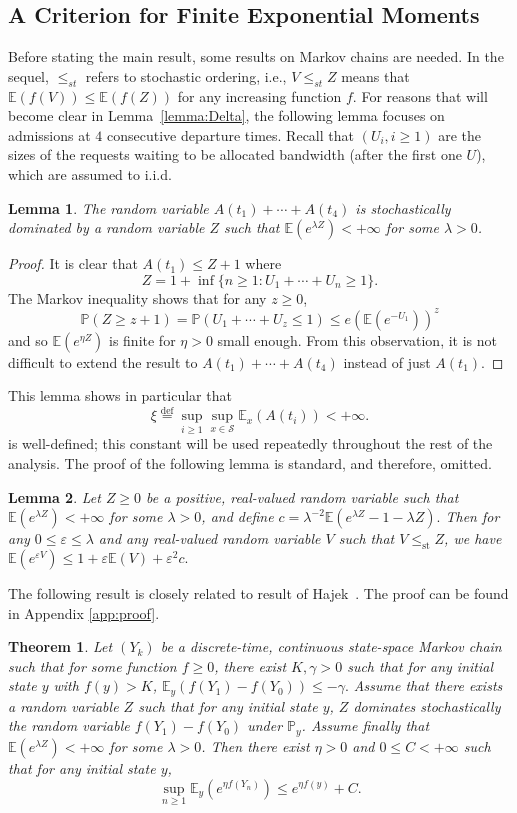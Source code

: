 \documentclass{amsart}
\def\E{\mathbb{E}}
\def\P{\mathbb{P}}
\def\Scal{\mathcal{S}}
\newtheorem{theorem}{Theorem}
\newtheorem{lemma}{Lemma}
\begin{document}
\subsection*{A Criterion for Finite Exponential Moments}
Before stating the main result, some  results on Markov chains are
needed. In the sequel, $\leq_{st}$ refers to stochastic ordering,
i.e., $V \leq_{st} Z$ means that $\E(f(V)) \leq \E(f(Z))$ for any
increasing function $f$. For reasons that will become clear in Lemma~\ref{lemma:Delta},
the following lemma focuses on admissions at $4$ consecutive departure
times. Recall that $(U_i, i \geq 1)$ are the sizes of the requests waiting to be allocated bandwidth (after the first one $U$), which are assumed to i.i.d.
\begin{lemma}\label{lemma:coupling}
    The random variable $A(t_1) + \cdots + A(t_4)$ is stochastically dominated by a random
    variable $Z$ such that $\E(e^{\lambda Z}) < +\infty$ for some $\lambda > 0$.
\end{lemma}
\begin{proof}
It is clear that $A(t_1) \leq Z+1$ where
    \[ Z = 1 + \inf \{ n \geq 1: U_1 + \cdots + U_n \geq 1\}. \]
The Markov inequality shows that for any $z
\geq 0$,
 \[ \P(Z \geq z+1) = \P(U_1 + \cdots + U_z \leq 1) \leq
    e \left( \E\left( e^{-U_1} \right) \right)^z \]
and so $\E(e^{\eta Z})$ is finite for $\eta > 0$ small enough. From
this observation, it is not difficult to extend the result to
$A(t_1) + \cdots + A(t_4)$ instead of just
    $A(t_1)$.
\end{proof}
This lemma shows in particular that
\[  \xi \stackrel{\text{def}}{=} \sup_{i \geq 1}
\sup_{x \in \Scal} \E_x(A(t_i)) < +\infty. \] is well-defined; this
constant will be used repeatedly throughout the rest of the
analysis. The proof of the following lemma is standard, and therefore,
omitted.
\begin{lemma} \label{lemma}
Let $Z \geq 0$ be a positive, real-valued random variable such that
$\E(e^{\lambda Z}) < +\infty$ for some $\lambda > 0$, and define
    $c = \lambda^{-2} \E(e^{\lambda Z} - 1 - \lambda Z). $
Then for any $0 \leq \varepsilon \leq \lambda$ and any real-valued
random variable $V$ such that $V \leq_{\text{st}} Z$, we have
    $ \E \left( e^{\varepsilon V} \right) \leq 1 + \varepsilon \E(V) + \varepsilon^2 c.
    $
\end{lemma}
The following result is closely related to result of
Hajek~\cite{Hajek82:0}. The proof can be found in Appendix \ref{app:proof}.
\begin{theorem} \label{thm:hajek}
Let $(Y_k)$ be a discrete-time, continuous state-space Markov chain
such that for some function $f \geq 0$, there exist $K, \gamma > 0$
such that for any initial state $y$ with $f(y) > K$,
    $ \E_y(f(Y_1) - f(Y_0)) \leq -\gamma. $
Assume that there exists a random variable $Z$ such that for any
initial state $y$, $Z$ dominates stochastically the random variable
$f(Y_1) - f(Y_0)$ under $\P_y$. Assume finally that $\E(e^{\lambda
Z}) < +\infty$ for some $\lambda > 0$. Then there exist $\eta > 0$
and $0 \leq C < +\infty$ such that for any initial state $y$,
\[ \sup_{n \geq 1} \E_y \left( e^{\eta f(Y_n)} \right) \leq e^{\eta f(y)} + C. \]
\end{theorem}
\end{document}
